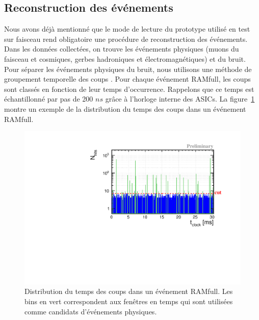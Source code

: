 \subsection{Reconstruction des événements}
\label{sec.trivent}
Nous avons déjà mentionné que le mode de lecture du prototype utilisé en test sur faisceau rend obligatoire une procédure de reconstruction des événements. Dans les données collectées, on trouve les événements physiques (muons du faisceau et cosmiques, gerbes hadroniques et électromagnétiques) et du bruit. Pour séparer les événements physiques du bruit, nous utilisons une méthode de groupement temporelle des coups \cite{sdhcal-com}. Pour chaque événement RAMfull, les coups sont classés en fonction de leur temps d’occurrence. Rappelons que ce temps est échantillonné par pas de 200 $ns$ grâce à l'horloge interne des ASICs. La figure~\ref{fig:time_spectrum} montre un exemple de la distribution du temps des coups dans un événement RAMfull. 
\begin{figure}[!h]
  \begin{center}
    \includegraphics[width=.9\textwidth]{SDHCAL/figs/time_spectrum.pdf}
    \caption{Distribution du temps des coups dans un événement RAMfull. Les bins en vert correspondent aux fenêtres en temps qui sont utilisées comme candidats d'événements physiques.}
    \label{fig:time_spectrum}
  \end{center}
\end{figure}
